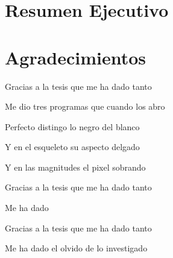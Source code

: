 \begin{preface}
\section{Resumen Ejecutivo}


\section{Agradecimientos}

\noindent Gracias a la tesis que me ha dado tanto

\noindent Me dio tres programas que cuando los abro

\noindent Perfecto distingo lo negro del blanco

\noindent Y en el esqueleto su aspecto delgado

\noindent Y en las magnitudes el pixel sobrando 

\noindent Gracias a la tesis que me ha dado tanto

\noindent Me ha dado 

\noindent Gracias a la tesis que me ha dado tanto

\noindent Me ha dado el olvido de lo investigado

\noindent 


\begin{flushright}
\makeatletter
	\@author
\makeatother
\end{flushright}

\tableofcontents

\listoftables

\listoffigures

\end{preface}